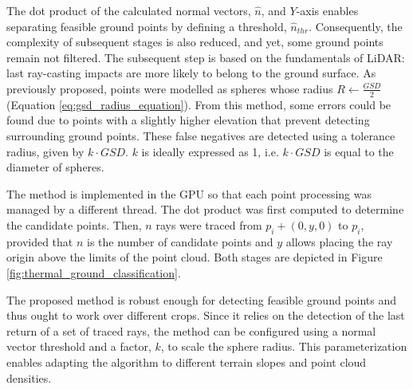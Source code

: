 The dot product of the calculated normal vectors, $\hat{n}$, and $Y$-axis enables separating feasible ground points by defining a threshold, $\hat{n}_{thr}$. Consequently, the complexity of subsequent stages is also reduced, and yet, some ground points remain not filtered. The subsequent step is based on the fundamentals of LiDAR: last ray-casting impacts are more likely to belong to the ground surface. As previously proposed, points were modelled as spheres whose radius $R \gets \frac{GSD}{2}$ (Equation \ref{eq:gsd_radius_equation}). From this method, some errors could be found due to points with a slightly higher elevation that prevent detecting surrounding ground points. These false negatives are detected using a tolerance radius, given by $k \cdot \textit{GSD}$. $k$ is ideally expressed as 1, i.e. $k \cdot \textit{GSD}$ is equal to the diameter of spheres.

The method is implemented in the GPU so that each point processing was managed by a different thread. The dot product was first computed to determine the candidate points. Then, $n$ rays were traced from $p_i + (0, y, 0)$ to $p_i$, provided that $n$ is the number of candidate points and $y$ allows placing the ray origin above the limits of the point cloud. Both stages are depicted in Figure \ref{fig:thermal_ground_classification}. 

\begin{kaobox}[frametitle=On the application of the classification to other environments]
The proposed method is robust enough for detecting feasible ground points and thus ought to work over different crops. Since it relies on the detection of the last return of a set of traced rays, the method can be configured using a normal vector threshold and a factor, $k$, to scale the sphere radius. This parameterization enables adapting the algorithm to different terrain slopes and point cloud densities.
\end{kaobox}

